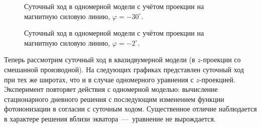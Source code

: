 \documentclass[14pt, a4paper, fleqn]{extarticle}
\begin{document}
\begin{figure}[H]
\caption{Суточный ход в одномерной модели с учётом проекции на магнитную силовую линию, $\varphi = -30^\circ$.}
\end{figure}

\begin{figure}[H]
\caption{Суточный ход в одномерной модели с учётом проекции на магнитную силовую линию, $\varphi = -2^\circ$.}
\end{figure}



Теперь рассмотрим суточный ход в квазидвумерной модели (в $z$-проекции со смешанной производной). На следующих графиках представлен суточный ход при тех же широтах, что и в случае одномерного уравнения с $z$-проекцией. Эксперимент повторяет действия с одномерной моделью: вычисление стационарного дневного решения с последующим изменением функции фотоионизации в согласии с суточным ходом. Существенное отличие наблюдается в характере решения вблизи экватора~---~уравнение не вырождается. 
\end{document}
